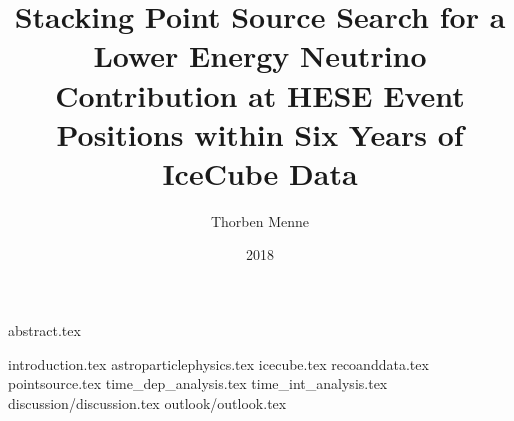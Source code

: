 


\author{Thorben Menne}
\title{Stacking Point Source Search for a Lower Energy Neutrino Contribution at HESE Event Positions within Six Years of IceCube Data}
\date{2018}

\titlehead{\texttt{[image: inc/tu-logo.pdf]}}




\frontmatter
\maketitle
\makecorrectorpage
{abstract.tex}

\tableofcontents

\mainmatter
{introduction.tex}
{astroparticlephysics.tex}
{icecube.tex}
{recoanddata.tex}
{pointsource.tex}
{time_dep_analysis.tex}
{time_int_analysis.tex}
{discussion/discussion.tex}
{outlook/outlook.tex}

\appendix

\backmatter
% 




